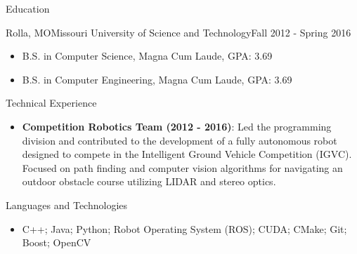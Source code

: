 \documentclass[]{mcdowellcv}
\begin{document}
\begin{cvsection}{Education}
    \begin{cvsubsection}[2]{Rolla, MO}{Missouri University of Science and Technology}{Fall 2012 - Spring 2016}
        \begin{itemize}
            \item B.S. in Computer Science, Magna Cum Laude, GPA: 3.69
            \item B.S. in Computer Engineering, Magna Cum Laude, GPA: 3.69
        \end{itemize}
    \end{cvsubsection}
\end{cvsection} 

\begin{cvsection}{Technical Experience}
    \begin{cvsubsection}{}{}{}  
        \begin{itemize} 
            \item \textbf{Competition Robotics Team (2012 - 2016)}: Led the programming division and contributed to the development of a fully autonomous robot designed to compete in the Intelligent Ground Vehicle Competition (IGVC). Focused on path finding and computer vision algorithms for navigating an outdoor obstacle course utilizing LIDAR and stereo optics.
        \end{itemize}
    \end{cvsubsection}
\end{cvsection}

\begin{cvsection}{Languages and Technologies}
    \begin{cvsubsection}{}{}{}  
        \begin{itemize}
            \item C++; Java; Python; Robot Operating System (ROS); CUDA; CMake; Git; Boost; OpenCV
        \end{itemize}
    \end{cvsubsection}
\end{cvsection}
\end{document}
